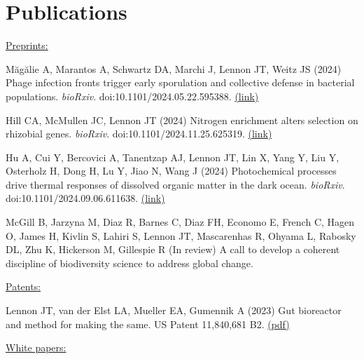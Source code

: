 \documentclass[11pt]{article}
\begin{document}
\section*{Publications}
\vspace{-0.25em} %
\begin{etaremune}

\item[] \textnormal{\underline{Preprints:}}

\item Măgălie A, Marantos A, Schwartz DA, Marchi J, Lennon JT, Weitz JS (2024) Phage infection fronts trigger early sporulation and collective defense in bacterial populations. \textit{bioRxiv}. doi:10.1101/2024.05.22.595388. \href{https://www.biorxiv.org/content/10.1101/2024.05.22.595388v1.full.pdf}{(link)}

\item Hill CA, McMullen JC, Lennon JT (2024) Nitrogen enrichment alters selection on rhizobial genes. \textit{bioRxiv}. doi:10.1101/2024.11.25.625319. \href{https://www.biorxiv.org/content/10.1101/2024.11.25.625319v1.full.pdf}{(link)}

\item Hu A, Cui Y, Bercovici A, Tanentzap AJ, Lennon JT, Lin X, Yang Y, Liu Y, Osterholz H, Dong H, Lu Y, Jiao N, Wang J (2024) Photochemical processes drive thermal responses of dissolved organic matter in the dark ocean. \textit{bioRxiv}. doi:10.1101/2024.09.06.611638. \href{https://www.biorxiv.org/content/10.1101/2024.09.06.611638v1.full.pdf}{(link)}

\item McGill B, Jarzyna M, Diaz R, Barnes C, Diaz FH, Economo E, French C, Hagen O, James H, Kivlin S, Lahiri S, Lennon JT, Mascarenhas R, Ohyama L, Rabosky DL, Zhu K, Hickerson M, Gillespie R (In review) A call to develop a coherent discipline of biodiversity science to address global change.

\vspace{1em}
\item[] \textnormal{\underline{Patents:}}
\item Lennon JT, van der Elst LA, Mueller EA, Gumennik A (2023) Gut bioreactor and method for making the same. US Patent 11,840,681 B2. \href{https://lennonlab.github.io/assets/publications/Lennon_etal_2023b.pdf}{(pdf)}

\vspace{1em}
\item[] \textnormal{\underline{White papers:}}


\end{etaremune}
\end{document}
